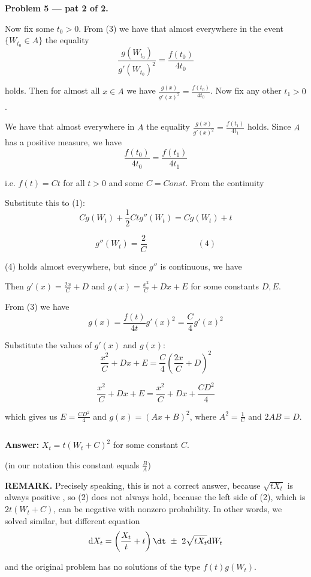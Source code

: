 \documentclass[12pt, a4paper]{article}
\newcommand{\ds}{\displaystyle}
\begin{document}
\textbf{Problem 5 — pat 2 of 2.}\par

Now fix some $t_{0} > 0$. From (3) we have that almost everywhere in the event $\{W_{t_{0}} \in A\}$ the equality
$$
\frac{\ds g(W_{t_{0}})}{\ds g'(W_{t_{0}})^{2}} = \frac{\ds f(t_{0})}{\ds 4 t_{0}}
$$\par
holds. Then for almost all $x \in A$ we have $\frac{\ds g(x)}{\ds g'(x)^{2}} = \frac{\ds f(t_{0})}{\ds 4 t_{0}}$. Now fix any other $t_{1} > 0$.\par
We have that almost everywhere in $A$ the equality $\frac{\ds g(x)}{\ds g'(x)^{2}} = \frac{\ds f(t_{1})}{\ds 4 t_{1}}$ holds. Since $A$ has a positive measure, we have
$$
\frac{\ds f(t_{0})}{\ds 4t_{0}} = \frac{\ds f(t_{1})}{\ds 4t_{1}}
$$\par
i.e. $f(t) = Ct$ for all $t > 0$ and some $C = Const$. From the continuity \[\]\par
Substitute this to (1):
$$
Cg(W_{t}) + \frac{\ds 1}{\ds 2}Ctg''(W_{t}) = Cg(W_{t}) + t
$$

$$
g''(W_{t}) = \frac{\ds 2}{\ds C}\qquad\qquad\qquad (4)
$$\par
(4) holds almost everywhere, but since $g''$ is continuous, we have \fbox{$g''(x) \equiv \frac{\ds 2}{\ds C}$}\par
Then $g'(x) =  \frac{\ds 2x}{\ds C} + D$ and $g(x) = \frac{\ds x^{2}}{\ds C} + Dx + E$ for some constants $D,E$.\par
From (3) we have
$$
g(x) = \frac{\ds f(t)}{\ds 4t}g'(x)^{2} = \frac{\ds C}{\ds 4}g'(x)^{2}
$$\par
Substitute the values of $g'(x)$ and $g(x)$:
$$
\frac{\ds x^{2}}{\ds C} + Dx + E = \frac{\ds C}{\ds 4}\left(\frac{\ds 2x}{\ds C} + D\right)^{2}
$$

$$
\frac{\ds x^{2}}{\ds C} + Dx + E = \frac{\ds x^{2}}{\ds C} + Dx + \frac{\ds CD^{2}}{\ds 4}
$$\par
which gives us $E =  \frac{\ds CD^{2}}{\ds 4}$ and $g(x) = (Ax + B)^{2}$, where $A^{2} = \frac{\ds 1}{\ds C}$ and $2AB = D$.\par
\[\]\par
\textbf{Answer:} $X_{t} = t(W_{t} + C)^{2}$ for some constant $C$.\par
(in our notation this constant equals $\frac{\ds B}{\ds A}$)\par
\textbf{REMARK.} Precisely speaking, this is not a correct answer, because $\sqrt{tX_{t}}$ is always positive , so (2) does not always hold, because the left side of (2), which is $2t(W_{t} + C)$, can be negative with nonzero probability. In other words, we solved similar, but different equation
$$
\mathrm{d}X_{t} = \left(\frac{\ds X_{t}}{\ds t} + t\right)\dt\ \pm\ 2\sqrt{t X_{t}}\mathrm{d}W_{t}
$$\par
and the original problem has no solutions of the type $f(t)g(W_{t})$.
\end{document}

